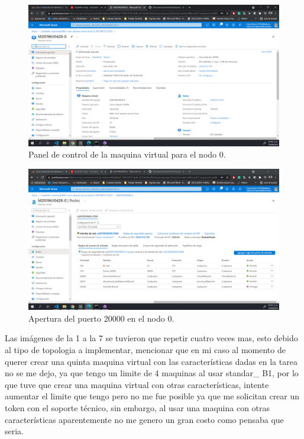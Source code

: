 \documentclass[11pt]{article}
\begin{document}
		\begin{figure}[H]
			\centering
			\includegraphics[scale=0.34]{resources/Panelcontrol.png}
			\caption{Panel de control de la maquina virtual para el nodo 0. }\label{fig:picture}
		\end{figure}
		\begin{figure}[H]
			\centering
			\includegraphics[scale=0.34]{resources/puerto20000abierto.png}
			\caption{Apertura del puerto 20000 en el nodo 0. }\label{fig:picture}
		\end{figure}
Las imágenes de la 1 a la 7 se tuvieron que repetir cuatro veces mas, esto debido al tipo de topologia a implementar, mencionar que en mi caso al momento de querer crear una quinta maquina virtual con las características dadas en la tarea no se me dejo, ya que tengo un limite de 4 maquinas al usar standar\_ B1, por lo que tuve que crear una maquina virtual con otras características, intente aumentar el limite que tengo pero no me fue posible ya que me solicitan crear un token con el soporte técnico, sin embargo, al usar una maquina con otras características aparentemente no me genero un gran costo como pensaba que seria.\par
\end{document}
